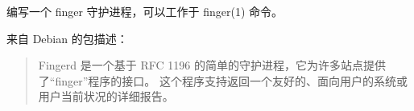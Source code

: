 \begin{Exercise}[title={*Finger 守护进程},difficulty=8]
\label{ex:finger}
\Question
编写一个 finger 守护进程，可以工作于 finger(1) 命令。

来自 Debian 的包描述：
\begin{quote}
Fingerd 是一个基于 RFC 1196 \cite{RFC1196} 的简单的守护进程，它为许多站点提供了``finger''程序的接口。
这个程序支持返回一个友好的、面向用户的系统或用户当前状况的详细报告。
\end{quote}

\end{Exercise}
